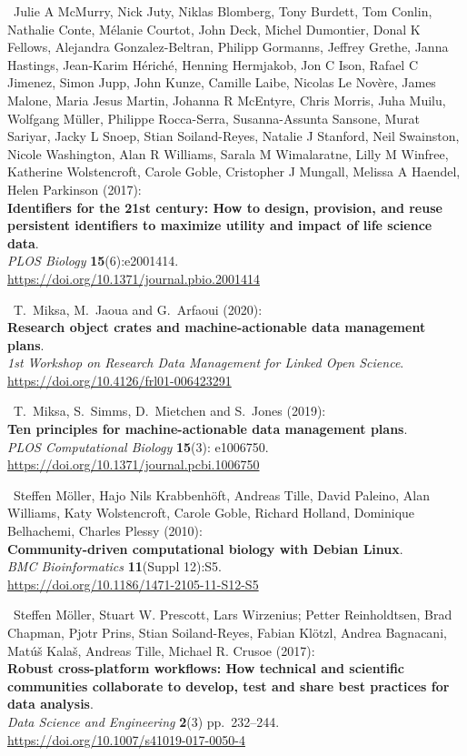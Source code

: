 \begin{thebibliography}{9}
~Julie A McMurry, Nick Juty, Niklas Blomberg, Tony Burdett, Tom
Conlin, Nathalie Conte, Mélanie Courtot, John Deck, Michel Dumontier,
Donal K Fellows, Alejandra Gonzalez-Beltran, Philipp Gormanns, Jeffrey
Grethe, Janna Hastings, Jean-Karim Hériché, Henning Hermjakob, Jon C
Ison, Rafael C Jimenez, Simon Jupp, John Kunze, Camille Laibe, Nicolas
Le Novère, James Malone, Maria Jesus Martin, Johanna R McEntyre, Chris
Morris, Juha Muilu, Wolfgang Müller, Philippe Rocca-Serra,
Susanna-Assunta Sansone, Murat Sariyar, Jacky L Snoep, Stian
Soiland-Reyes, Natalie J Stanford, Neil Swainston, Nicole Washington,
Alan R Williams, Sarala M Wimalaratne, Lilly M Winfree, Katherine
Wolstencroft, Carole Goble, Cristopher J Mungall, Melissa A Haendel,
Helen Parkinson (2017):\\
\textbf{Identifiers for the 21st century: How to design, provision, and
reuse persistent identifiers to maximize utility and impact of life
science data}.\\
\emph{PLOS Biology} \textbf{15}(6):e2001414.\\
\url{https://doi.org/10.1371/journal.pbio.2001414}

~T.~Miksa, M.~Jaoua and G.~Arfaoui (2020):\\
\textbf{Research object crates and machine-actionable data management
plans}.\\
\emph{1st Workshop on Research Data Management for Linked Open
Science}.\\
\url{https://doi.org/10.4126/frl01-006423291}

~T.~Miksa, S.~Simms, D.~Mietchen and S.~Jones (2019):\\
\textbf{Ten principles for machine-actionable data management plans}.\\
\emph{PLOS Computational Biology} \textbf{15}(3): e1006750.\\
\url{https://doi.org/10.1371/journal.pcbi.1006750}

~Steffen Möller, Hajo Nils Krabbenhöft, Andreas Tille, David
Paleino, Alan Williams, Katy Wolstencroft, Carole Goble, Richard
Holland, Dominique Belhachemi, Charles Plessy (2010):\\
\textbf{Community-driven computational biology with Debian Linux}.\\
\emph{BMC Bioinformatics} \textbf{11}(Suppl 12):S5.\\
\url{https://doi.org/10.1186/1471-2105-11-S12-S5}

~Steffen Möller, Stuart W. Prescott, Lars Wirzenius; Petter
Reinholdtsen, Brad Chapman, Pjotr Prins, Stian Soiland-Reyes, Fabian
Klötzl, Andrea Bagnacani, Matúš Kalaš, Andreas Tille, Michael R. Crusoe
(2017):\\
\textbf{Robust cross-platform workflows: How technical and scientific
communities collaborate to develop, test and share best practices for
data analysis}.\\
\emph{Data Science and Engineering} \textbf{2}(3) pp.~232--244.\\
\url{https://doi.org/10.1007/s41019-017-0050-4}


\end{thebibliography}
